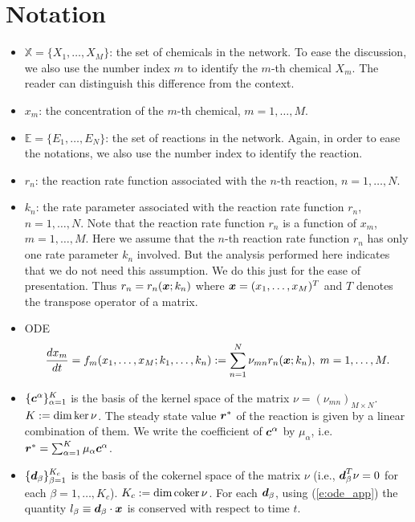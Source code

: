 \documentclass[ amsmath,amssymb,nofootinbib
]{revtex4-1}
\def\mbf#1{\mbox{\boldmath $#1$}}
\newcommand{\bx}{{\mbf x}}
\newcommand{\br}{{\mbf r}}
\begin{document}
\section{Notation}
\begin{itemize}

\item
        $\mathbb X = \{X_1,\ldots, X_M\}$: the set of chemicals in the network.
        To ease the discussion, we also use the number index $m$ to identify the  $m$-th chemical $X_m$.
        The reader can distinguish this difference from the context.
\item
       $x_m$: the concentration of the $m$-th chemical, $m=1, \ldots, M$.
\item
         $\mathbb E = \{E_1,\ldots,E_N\}$: the set of  reactions in the network.
         Again, in order to ease the notations,
         we also use the number index to identify the reaction.
\item
       $r_n$: the reaction rate function associated with the $n$-th reaction, $n=1, \ldots, N$.

\item
       $k_n$: the  rate parameter associated with the reaction rate function  $r_n$, $n=1, \ldots, N$.
       Note that the reaction rate function $r_n$ is a function of $x_m$, $m=1,\ldots,M$.
       Here we assume that the $n$-th reaction rate function $r_n$ has only one rate parameter $k_n$ involved.
       But the analysis performed here indicates that we do not need this assumption.
       We do this just for the ease of presentation.
       Thus $r_n= r_n(\bx;k_n)$ where $\bx = (x_1,\ldots,x_M)^T$ and  $T$  denotes the transpose operator of a matrix.

\item ODE
\begin{align} \label{e:ode_app}
\frac{d x_m}{dt}= f_m(x_1,\ldots,x_M;k_1,\ldots,k_n) := \sum_{n=1}^N \nu_{mn} r_n(\bx;k_n),   \; m=1,\ldots,M.
\end{align}


\item  $\{{\mbf c}^\alpha\}_{\alpha=1}^K$ is the basis of the kernel space of the matrix $\nu = (\nu_{mn})_{M \times N}$.
$K:= {\rm dim \, ker}\, \nu$.
The steady state value $\br^*$ of the reaction   is given by a linear combination of them. We write
the coefficient of ${\mbf c}^\alpha$ by $\mu_\alpha $, i.e. $\br^* =\sum_{\alpha=1}^K  \mu_\alpha {\mbf c}^\alpha$.

\item $\{{\mbf d}_\beta\}_{\beta=1}^{K_c}$ is the basis of  the cokernel space of the matrix $\nu$
(i.e., ${\mbf d}_\beta^T\nu = 0$ for each $\beta = 1, \ldots,K_c$). $K_c:= {\rm dim \, coker}\, \nu$.
For each $ {\mbf d}_\beta$, using (\ref{e:ode_app})
the quantity $l_\beta \equiv{\mbf d}_\beta  \cdot  {\bx}$ is conserved with respect to time $t$.
\end{itemize}
\end{document}
